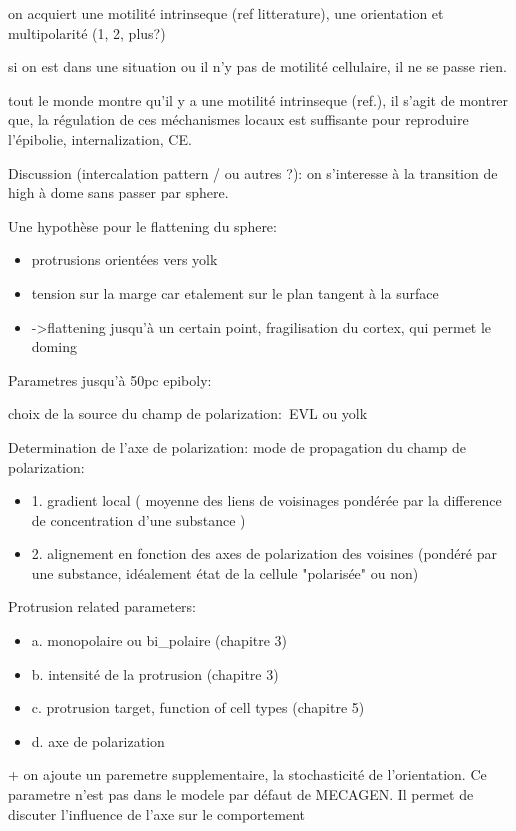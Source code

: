   on acquiert une motilité intrinseque (ref litterature), une orientation et multipolarité (1, 2, plus?) 

  si on est dans une situation ou il n'y pas de motilité cellulaire, il ne se passe rien. 

  tout le monde montre qu'il y a une motilité intrinseque (ref.), il s'agit de montrer que, la régulation de ces méchanismes locaux est suffisante pour reproduire l'épibolie, internalization, CE. 

  Discussion (intercalation pattern / ou autres ?): on s'interesse à la transition de high à dome sans passer par sphere. 

  Une hypothèse pour le flattening du sphere: 
\begin{itemize}
	\item protrusions orientées vers yolk 
	\item tension sur la marge car etalement sur le plan tangent à la surface
	\item ->flattening jusqu'à un certain point, fragilisation du cortex, qui permet le doming
\end{itemize}

  Parametres jusqu'à 50pc epiboly: 

  choix de la source du champ de polarization: EVL ou yolk 

  Determination de l'axe de polarization: mode de propagation du champ de polarization:  
\begin{itemize}
	\item 1. gradient local ( moyenne des liens de voisinages pondérée par la difference de concentration d'une substance )
	\item 2. alignement en fonction des axes de polarization des voisines (pondéré par une substance, idéalement état de la cellule "polarisée" ou non)
\end{itemize}

  Protrusion related parameters: 
\begin{itemize}
	\item a. monopolaire ou bi_polaire (chapitre 3)
	\item b. intensité de la protrusion (chapitre 3)
	\item c. protrusion target, function of cell types (chapitre 5)
	\item d. axe de polarization
\end{itemize}  + on ajoute un paremetre supplementaire, la stochasticité de l'orientation. Ce parametre n'est pas dans le modele par défaut de MECAGEN. Il permet de discuter l'influence de l'axe sur le comportement      

